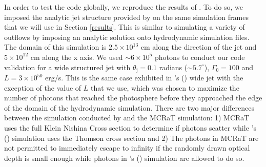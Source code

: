 \documentclass[12pt,a4paper]{article}
\begin{document}
In order to test the code globally, we reproduce the results of \cite{lundman2014polarization}. To do so, we imposed the analytic jet structure provided by \cite{lundman2014polarization} on the same simulation frames that we will use in Section \ref{results}. This is similar to \cite{MCRaT} simulating a variety of outflows by imposing an analytic solution onto hydrodynamic simulation files. {The domain of this simulation is $2.5 \times 10^{13}$ cm along the direction of the jet and $5 \times 10^{12}$ cm along the x axis.} We used $\sim 6 \times 10^5$ photons to conduct our code validation for a wide structured jet with $\theta_{\mathrm{j}}=0.1$ radians ($\sim 5.7^\circ$), $\Gamma_0=100$ and $L=3 \times 10^{50}$ erg/s. This is the same case exhibited in \citeauthor{lundman2014polarization}'s (\citeyear{lundman2014polarization}) wide jet with the exception of the value of $L$ that we use, which was chosen to maximize the number of photons that reached the photosphere before they approached the edge of the domain of the hydrodynamic simulation. {There are two major differences between the simulation conducted by \cite{lundman2014polarization} and the MCRaT simulation: 1) MCRaT uses the full Klein Nishina Cross section to determine if photons scatter while \citeauthor{lundman2014polarization}'s (\citeyear{lundman2014polarization}) simulation  uses the Thomson cross section and 2) The photons in MCRaT are not permitted to immediately escape to infinity if the randomly drawn optical depth is small enough while photons in  \citeauthor{lundman2014polarization}'s (\citeyear{lundman2014polarization}) simulation are allowed to do so. }
\end{document}

